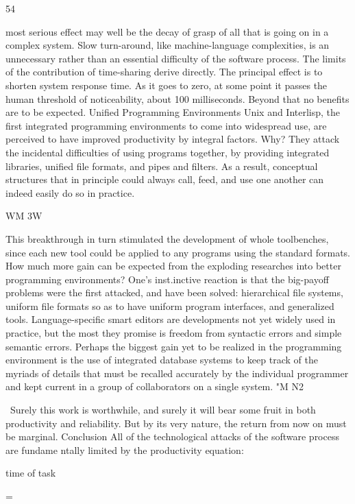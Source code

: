 \documentclass[12pt]{article}
\begin{document}
54

most serious effect may well be the decay of grasp of all that is going on in a complex
system.
Slow turn-around, like machine-language complexities, is an unnecessary rather than an
essential difficulty of the software process. The limits of the contribution of time-sharing
derive directly. The principal effect is to shorten system response time. As it goes to
zero, at some point it passes the human threshold of noticeability, about 100 milliseconds.
Beyond that no benefits are to be expected.
Unified Programming Environments
Unix and Interlisp, the first integrated programming environments to come into
widespread use, are perceived to have improved productivity by integral factors. Why?
They attack the incidental difficulties of using programs together, by providing integrated libraries, unified file formats, and pipes and filters. As a result, conceptual
structures that in principle could always call, feed, and use one another can indeed easily
do so in practice.

WM
3W

This breakthrough in turn stimulated the development of whole toolbenches, since each
new tool could be applied to any programs using the standard formats. How much more
gain can be expected from the exploding researches into better programming environments?
One's inst.inctive reaction is that the big-payoff problems were the first attacked, and have
been solved: hierarchical file systems, uniform file formats so as to have uniform program
interfaces, and generalized tools. Language-specific smart editors are developments not
yet widely used in practice, but the most they promise is freedom from syntactic errors
and simple semantic errors.
Perhaps the biggest gain yet to be realized in the programming environment is the use
of integrated database systems to keep track of the myriads of details that must be recalled
accurately by the individual programmer and kept current in a group of collaborators on
a single system.
"M
N2

~Surely
this work is worthwhile, and surely it will bear some fruit in both productivity
and reliability. But by its very nature, the return from now on must be marginal.
Conclusion
All of the technological attacks of the software process are fundame ntally limited by
the productivity equation:

time of task

=
\end{document}
